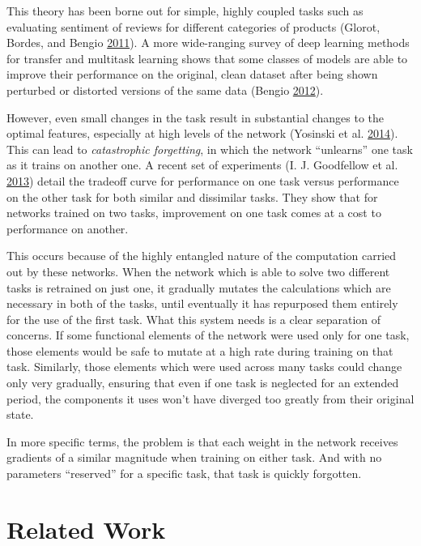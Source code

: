\documentclass[12pt,twoside]{mitthesis}
\begin{document}
This theory has been borne out for simple, highly coupled tasks such as
evaluating sentiment of reviews for different categories of products
(Glorot, Bordes, and Bengio
\protect\hyperlink{ref-glorot2011domain}{2011}). A more wide-ranging
survey of deep learning methods for transfer and multitask learning
shows that some classes of models are able to improve their performance
on the original, clean dataset after being shown perturbed or distorted
versions of the same data (Bengio
\protect\hyperlink{ref-bengio2012deep}{2012}).

However, even small changes in the task result in substantial changes to
the optimal features, especially at high levels of the network (Yosinski
et al. \protect\hyperlink{ref-yosinski2014transferable}{2014}). This can
lead to \emph{catastrophic forgetting}, in which the network
``unlearns'' one task as it trains on another one. A recent set of
experiments (I. J. Goodfellow et al.
\protect\hyperlink{ref-goodfellow2013empirical}{2013}) detail the
tradeoff curve for performance on one task versus performance on the
other task for both similar and dissimilar tasks. They show that for
networks trained on two tasks, improvement on one task comes at a cost
to performance on another.

This occurs because of the highly entangled nature of the computation
carried out by these networks. When the network which is able to solve
two different tasks is retrained on just one, it gradually mutates the
calculations which are necessary in both of the tasks, until eventually
it has repurposed them entirely for the use of the first task. What this
system needs is a clear separation of concerns. If some functional
elements of the network were used only for one task, those elements
would be safe to mutate at a high rate during training on that task.
Similarly, those elements which were used across many tasks could change
only very gradually, ensuring that even if one task is neglected for an
extended period, the components it uses won't have diverged too greatly
from their original state.

In more specific terms, the problem is that each weight in the network
receives gradients of a similar magnitude when training on either task.
And with no parameters ``reserved'' for a specific task, that task is
quickly forgotten.

\section{Related Work}\label{related-work-1}
\end{document}
